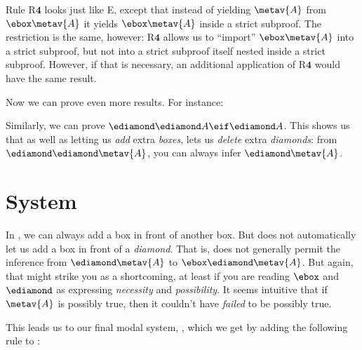 Rule R$\mathbf{4}$ looks just like {\ebox}E, except that instead of yielding $\metav{A}$ from $\ebox\metav{A}$ it yields $\ebox\metav{A}$ inside a strict subproof. The restriction is the same, however: R$\mathbf{4}$ allows us to ``import'' $\ebox \metav{A}$ into a strict subproof, but not into a strict subproof itself nested inside a strict subproof. However, if that is necessary, an additional application of R$\mathbf{4}$ would have the same result.

Now we can prove even more results. For instance:
\begin{fitchproof}
	\open
	\AS
	\open
	\AS
	\close
	\close
\end{fitchproof}
Similarly, we can prove $\ediamond\ediamond A \eif \ediamond A$. This shows us that as well as letting us \emph{add} extra \emph{boxes}, \mlSfour{} lets us \emph{delete} extra \emph{diamonds}: from $\ediamond\ediamond \metav{A}$, you can always infer $\ediamond\metav{A}$.

\section{System \mlSfive}
\label{S5}

In \mlSfour, we can always add a box in front of another box. But \mlSfour{} does not automatically let us add a box in front of a \emph{diamond}. That is, \mlSfour{} does not generally permit the inference from $\ediamond\metav{A}$ to $\ebox\ediamond\metav{A}$. But again, that might strike you as a shortcoming, at least if you are reading $\ebox$ and $\ediamond$ as expressing \emph{necessity} and \emph{possibility}. It seems intuitive that if $\metav{A}$ is possibly true, then it couldn't have \emph{failed} to be possibly true.

This leads us to our final modal system, \mlSfive, which we get by adding the following rule to \mlSfour:

